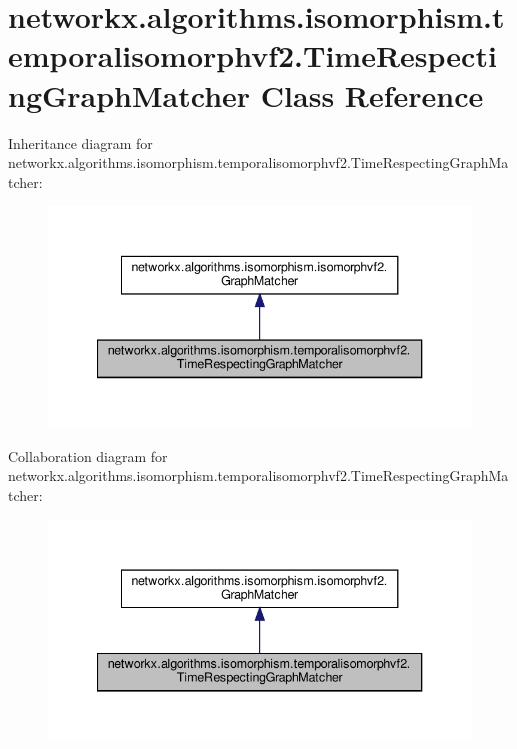 \hypertarget{classnetworkx_1_1algorithms_1_1isomorphism_1_1temporalisomorphvf2_1_1TimeRespectingGraphMatcher}{}\section{networkx.\+algorithms.\+isomorphism.\+temporalisomorphvf2.\+Time\+Respecting\+Graph\+Matcher Class Reference}
\label{classnetworkx_1_1algorithms_1_1isomorphism_1_1temporalisomorphvf2_1_1TimeRespectingGraphMatcher}


Inheritance diagram for networkx.\+algorithms.\+isomorphism.\+temporalisomorphvf2.\+Time\+Respecting\+Graph\+Matcher\+:
\nopagebreak
\begin{figure}[H]
\begin{center}
\leavevmode
\includegraphics[width=340pt]{classnetworkx_1_1algorithms_1_1isomorphism_1_1temporalisomorphvf2_1_1TimeRespectingGraphMatcher__inherit__graph}
\end{center}
\end{figure}


Collaboration diagram for networkx.\+algorithms.\+isomorphism.\+temporalisomorphvf2.\+Time\+Respecting\+Graph\+Matcher\+:
\nopagebreak
\begin{figure}[H]
\begin{center}
\leavevmode
\includegraphics[width=340pt]{classnetworkx_1_1algorithms_1_1isomorphism_1_1temporalisomorphvf2_1_1TimeRespectingGraphMatcher__coll__graph}
\end{center}
\end{figure}
